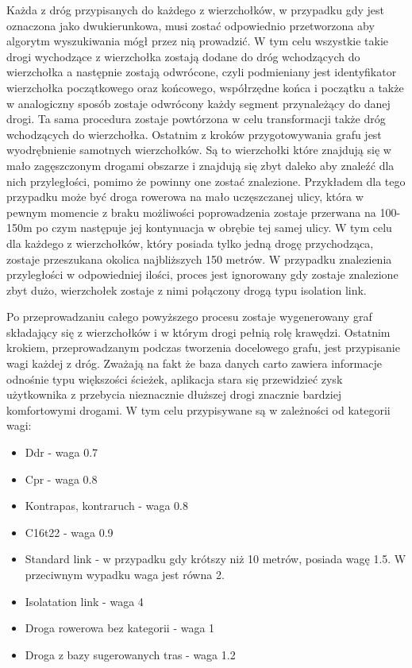 Każda z dróg przypisanych do każdego z wierzchołków, w przypadku gdy jest oznaczona jako dwukierunkowa, musi zostać odpowiednio przetworzona aby algorytm wyszukiwania mógł przez nią prowadzić. W tym celu wszystkie takie drogi wychodzące z wierzchołka zostają dodane do dróg wchodzących do wierzchołka a następnie zostają odwrócone, czyli podmieniany jest identyfikator wierzchołka początkowego oraz końcowego, współrzędne końca i początku a także w analogiczny sposób zostaje odwrócony każdy segment przynależący do danej drogi. Ta sama procedura zostaje powtórzona w celu transformacji także dróg wchodzących do wierzchołka.
Ostatnim z kroków przygotowywania grafu jest wyodrębnienie samotnych wierzchołków. Są to wierzchołki które znajdują się w mało zagęszczonym drogami obszarze i znajdują się zbyt daleko aby znaleźć dla nich przyległości, pomimo że powinny one zostać znalezione. Przykładem dla tego przypadku może być droga rowerowa na mało uczęszczanej ulicy, która w pewnym momencie z braku możliwości poprowadzenia zostaje przerwana na 100-150m po czym następuje jej kontynuacja w obrębie tej samej ulicy. W tym celu dla każdego z wierzchołków, który posiada tylko jedną drogę przychodząca, zostaje przeszukana okolica najbliższych 150 metrów. W przypadku znalezienia przyległości w odpowiedniej ilości, proces jest ignorowany gdy zostaje znalezione zbyt dużo, wierzchołek zostaje z nimi połączony drogą typu isolation link. \newline

Po przeprowadzaniu całego powyższego procesu zostaje wygenerowany graf składający się z wierzchołków i w którym drogi pełnią rolę krawędzi. Ostatnim krokiem, przeprowadzanym podczas tworzenia docelowego grafu, jest przypisanie wagi każdej z dróg. Zważają na fakt że baza danych carto zawiera informacje odnośnie typu większości ścieżek, aplikacja stara się przewidzieć zysk użytkownika z przebycia nieznacznie dłuższej drogi znacznie bardziej komfortowymi drogami. W tym celu przypisywane są w zależności od kategorii wagi:

\begin{itemize}
\item Ddr - waga 0.7
\item Cpr - waga 0.8
\item Kontrapas, kontraruch - waga 0.8
\item C16t22 - waga 0.9
\item Standard link - w przypadku gdy krótszy niż 10 metrów, posiada wagę 1.5. W przeciwnym wypadku waga jest równa 2.
\item Isolatation link - waga 4
\item Droga rowerowa bez kategorii - waga 1
\item Droga z bazy sugerowanych tras - waga 1.2
\end{itemize}

